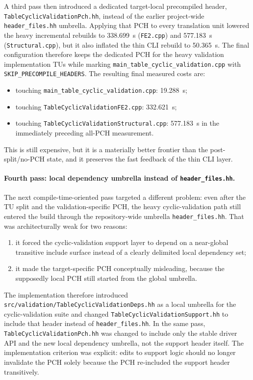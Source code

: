 A third pass then introduced a dedicated target-local precompiled header,
\texttt{TableCyclicValidationPch.hh}, instead of the earlier project-wide
\texttt{header\_files.hh} umbrella.  Applying that PCH to every translation
unit lowered the heavy incremental rebuilds to 338.699~s
(\texttt{FE2.cpp}) and 577.183~s (\texttt{Structural.cpp}), but it also
inflated the thin CLI rebuild to 50.365~s.  The final configuration therefore
keeps the dedicated PCH for the heavy validation implementation TUs while
marking \texttt{main\_table\_cyclic\_validation.cpp} with
\texttt{SKIP\_PRECOMPILE\_HEADERS}.  The resulting final measured costs are:
\begin{itemize}
  \item touching \texttt{main\_table\_cyclic\_validation.cpp}: 19.288~s;
  \item touching \texttt{TableCyclicValidationFE2.cpp}: 332.621~s;
  \item touching \texttt{TableCyclicValidationStructural.cpp}:
    577.183~s in the immediately preceding all-PCH measurement.
\end{itemize}
This is still expensive, but it is a materially better frontier than the
post-split/no-PCH state, and it preserves the fast feedback of the thin CLI
layer.

\paragraph{Fourth pass: local dependency umbrella instead of \texttt{header\_files.hh}.}
The next compile-time-oriented pass targeted a different problem: even after
the TU split and the validation-specific PCH, the heavy cyclic-validation path
still entered the build through the repository-wide umbrella
\texttt{header\_files.hh}.  That was architecturally weak for two reasons:
\begin{enumerate}
  \item it forced the cyclic-validation support layer to depend on a
    near-global transitive include surface instead of a clearly delimited local
    dependency set;
  \item it made the target-specific PCH conceptually misleading, because the
    supposedly local PCH still started from the global umbrella.
\end{enumerate}

The implementation therefore introduced
\texttt{src/validation/TableCyclicValidationDeps.hh} as a local umbrella for
the cyclic-validation suite and changed
\texttt{TableCyclicValidationSupport.hh} to include that header instead of
\texttt{header\_files.hh}.  In the same pass,
\texttt{TableCyclicValidationPch.hh} was changed to include only the stable
driver API and the new local dependency umbrella, not the support header
itself.  The implementation criterion was explicit: edits to support logic
should no longer invalidate the PCH solely because the PCH re-included the
support header transitively.

